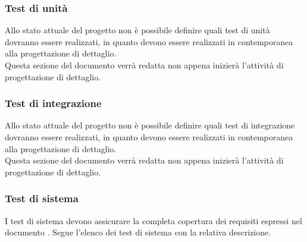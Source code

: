 \subsubsection{Test di unità}
Allo stato attuale del progetto non è possibile definire quali test di unità dovranno essere realizzati, in quanto devono essere realizzati in contemporanea alla progettazione di dettaglio.\\
Questa sezione del documento verrà redatta non appena inizierà l'attività di progettazione di dettaglio.

\subsubsection{Test di integrazione}
Allo stato attuale del progetto non è possibile definire quali test di integrazione dovranno essere realizzati, in quanto devono essere realizzati in contemporanea alla progettazione di dettaglio.\\
Questa sezione del documento verrà redatta non appena inizierà l'attività di progettazione di dettaglio.

\subsubsection{Test di sistema}
I test di sistema devono assicurare la completa copertura dei requisiti espressi nel documento \AdR{}.
Segue l'elenco dei test di sistema con la relativa descrizione.



\newpage
